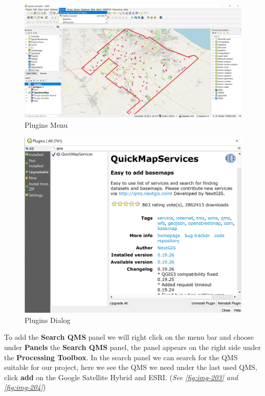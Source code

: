 \documentclass[
]{book}
\begin{document}
\begin{figure}

{\centering \includegraphics[width=1\linewidth]{images/plugins} 

}

\caption{Plugins Menu}\label{fig:img-201}
\end{figure}
\begin{figure}

{\centering \includegraphics[width=0.7\linewidth]{images/plugins2} 

}

\caption{Plugins Dialog}\label{fig:img-202}
\end{figure}

To add the \textbf{Search QMS} panel we will right click on the menu bar and choose under \textbf{Panels} the \textbf{Search QMS} panel, the panel appears on the right side under the \textbf{Processing Toolbox}. In the search panel we can search for the QMS suitable for our project, here we see the QMS we need under the last used QMS, click \textbf{add} on the {Google Satellite Hybrid} and {ESRI}. (\emph{See \ref{fig:img-203} and \ref{fig:img-204}})
\end{document}
